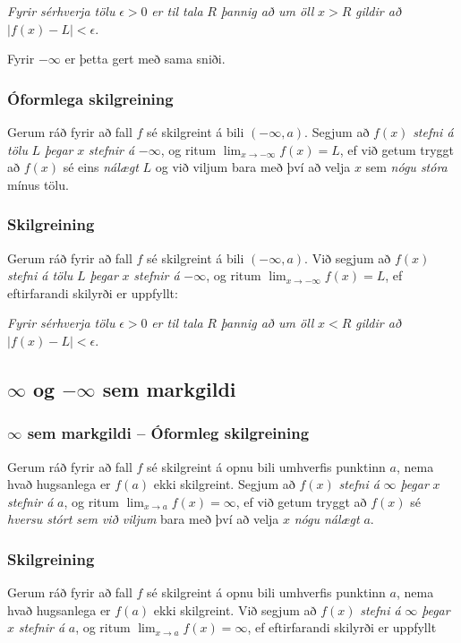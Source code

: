 \documentclass[icelandic,a4paper,12pt]{article}
\begin{document}
\emph{Fyrir sérhverja tölu} $\epsilon>0$ \emph{er til tala} $R$ \emph{þannig að um öll} $x>R$
\emph{gildir að} $|f(x)-L|<\epsilon$.

Fyrir $-\infty$ er þetta gert með sama sniði.

\subsubsection{Óformlega skilgreining}
Gerum ráð fyrir að fall $f$ sé
skilgreint á bili $(-\infty, a)$.  Segjum að  $f(x)$
\emph{stefni á tölu} $L$ \emph{þegar} $x$ \emph{stefnir á} $-\infty$, og ritum
$\lim_{x\rightarrow -\infty} f(x)=L$, ef við getum tryggt að  $f(x)$ sé eins
\emph{nálægt} $L$ og við viljum bara með því að velja $x$ sem \emph{nógu stóra} mínus tölu.

\pause
 
\subsubsection{Skilgreining}
Gerum ráð fyrir að fall $f$ sé
skilgreint á bili $(-\infty,a)$.  Við segjum að $f(x)$
\emph{stefni á tölu} $L$ \emph{þegar} $x$ \emph{stefnir á} $-\infty$, og ritum
$\lim_{x\rightarrow -\infty} f(x)=L$, ef eftirfarandi skilyrði er uppfyllt:

\emph{Fyrir sérhverja tölu} $\epsilon>0$ \emph{er til tala} $R$ \emph{þannig að um öll} $x<R$ 
\emph{gildir að}  $|f(x)-L|<\epsilon$.

\subsection{$\infty$ og $-\infty$ sem markgildi}
\subsubsection{$\infty$ sem markgildi -- Óformleg skilgreining}
Gerum ráð fyrir að fall $f$ sé
skilgreint á opnu bili umhverfis punktinn $a$, nema hvað hugsanlega er
$f(a)$ ekki skilgreint.  Segjum að  $f(x)$
\emph{stefni á} $\infty$ \emph{þegar} $x$ \emph{stefnir á} $a$, og ritum
$\lim_{x\rightarrow a} f(x)=\infty$, ef við getum tryggt að  $f(x)$ sé 
\emph{hversu stórt sem við viljum}  bara með því að velja $x$ \emph{nógu nálægt} $a$.  
 
\pause
\subsubsection{Skilgreining}
Gerum ráð fyrir að fall $f$ sé
skilgreint á opnu bili umhverfis punktinn $a$, nema hvað hugsanlega er
$f(a)$ ekki skilgreint.  Við segjum að $f(x)$
\emph{stefni á} $\infty$ \emph{þegar} $x$ \emph{stefnir á} $a$, og ritum
$\lim_{x\rightarrow a} f(x)=\infty$, ef eftirfarandi skilyrði er uppfyllt
\end{document}
